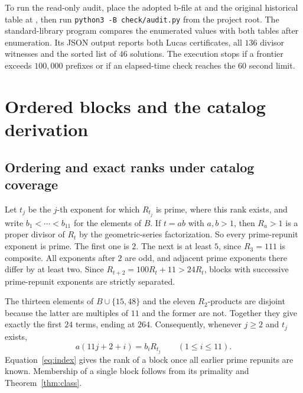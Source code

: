 \documentclass[11pt]{article}
\begin{document}
To run the read-only audit, place the adopted b-file at
 and the original historical table at
, then run \verb|python3 -B check/audit.py|
from the project root. The standard-library program compares the
enumerated values with both tables after enumeration. Its JSON
output reports both Lucas certificates, all \(136\) divisor witnesses
and the sorted list of \(46\) solutions. The execution stops if a
frontier exceeds \(100{,}000\) prefixes or if an elapsed-time check
reaches the \(60\) second limit.

\section{Ordered blocks and the catalog derivation}\label{sec:catalog}

\subsection{Ordering and exact ranks under catalog coverage}

Let \(t_j\) be the \(j\)-th exponent for which \(R_{t_j}\) is prime,
where this rank exists, and write \(b_1<\cdots<b_{11}\) for the
elements of \(B\). If \(t=ab\) with \(a,b>1\), then
\(R_a>1\) is a proper divisor of \(R_t\) by the geometric-series
factorization. So every prime-repunit exponent is prime. The first
one is \(2\). The next is at least \(5\), since \(R_3=111\) is
composite. All exponents after \(2\) are odd, and adjacent prime
exponents there differ by at least two. Since
\(R_{t+2}=100R_t+11>24R_t\), blocks with successive prime-repunit
exponents are strictly separated.

The thirteen elements of \(B\cup\{15,48\}\) and the eleven
\(R_2\)-products are disjoint because the latter are multiples of
\(11\) and the former are not. Together they give exactly the first
\(24\) terms, ending at \(264\). Consequently, whenever \(j\ge2\)
and \(t_j\) exists,
\begin{equation}\label{eq:index}
 a(11j+2+i)=b_iR_{t_j}\qquad (1\le i\le11).
\end{equation}
Equation~\eqref{eq:index} gives the rank of a block once all earlier
prime repunits are known. Membership of a single block follows
from its primality and Theorem~\ref{thm:class}.
\end{document}
